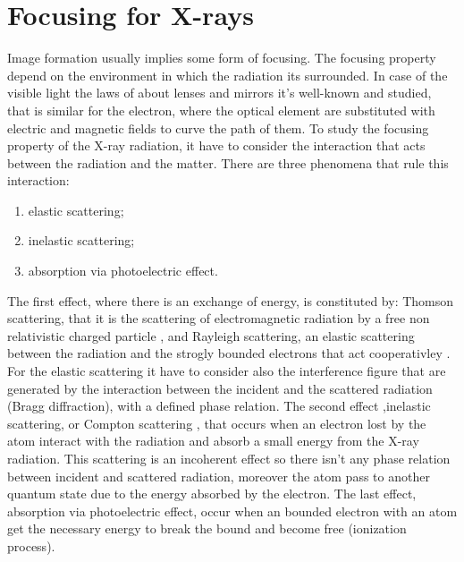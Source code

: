 \chapter{Focusing for X-rays}
\label{Introduzione}
\thispagestyle{empty}


Image formation usually implies some form of focusing. The focusing property depend on the environment in which the radiation its surrounded. In case of the visible light the laws of about lenses and mirrors it's well-known and studied, that is similar for the electron, where the optical element are substituted with electric and magnetic fields to curve the path of them. To study the focusing property of the X-ray radiation, it have to consider the interaction that acts between the radiation and the matter. There are three phenomena that rule this interaction:
\begin{enumerate}
\item elastic scattering;
\item inelastic scattering;
\item absorption via photoelectric effect.
\end{enumerate}
The first effect, where there is an exchange of energy, is constituted by: Thomson scattering, that it is the scattering of electromagnetic radiation by a free non relativistic charged particle \cite{ThomsonScattering}, and Rayleigh scattering, an elastic scattering between the radiation and the strogly bounded electrons that act cooperativley \cite{RayleighScattering}. For the elastic scattering it have to consider also the interference figure that are generated by the interaction between the incident and the scattered radiation (Bragg diffraction), with a defined phase relation. The second effect ,inelastic scattering, or Compton scattering \cite{ComptonScattering}, that occurs when an electron lost by the atom interact with the radiation and absorb a small energy from the X-ray radiation. This scattering is an incoherent effect so there isn't any phase relation between incident and scattered radiation, moreover the atom pass to another quantum state due to the energy absorbed by the electron. The last effect, absorption via photoelectric effect, occur when an bounded electron with an atom get the necessary energy to break the bound and become free (ionization process).
%
